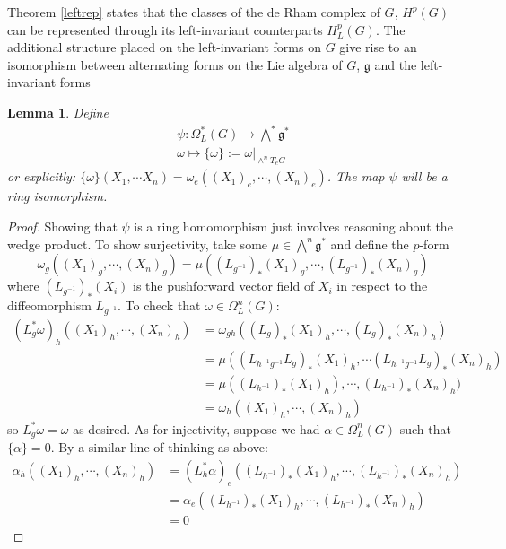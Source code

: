 \documentclass[12pt]{amsart}
\newtheorem{lemma}[theorem]{Lemma}
\numberwithin{equation}{section}
\begin{document}
%
Theorem \ref{leftrep} states that the classes of the de Rham complex of $G$, $H^p(G)$ can be represented through its left-invariant counterparts $H^p_L(G)$. The additional structure placed on the left-invariant forms on $G$ give rise to an isomorphism between alternating forms on the Lie algebra of $G$, $\mathfrak{g}$  and the left-invariant forms
\begin{lemma}
Define
      \begin{gather}
        \psi: \Omega_L^{*}(G) \rightarrow \bigwedge^* \mathfrak{g}^* \\
        \omega \mapsto \{\omega\} := \omega\vert_{\wedge^n T_eG}
      \end{gather}
or explicitly:
$\{\omega\}(X_1,\cdots X_n) = \omega_e((X_1)_e, \cdots, (X_n)_e)$. The map $\psi$ will be a ring isomorphism.
\end{lemma}
\begin{proof}
  Showing that $\psi$ is a ring homomorphism just involves reasoning about the wedge product. To show surjectivity, take some $\mu \in \bigwedge^n\mathfrak{g}^*$ and define the $p$-form
  $$ \omega_g((X_1)_g,\cdots,(X_n)_g) = \mu((L_{g^{-1}})_*(X_1)_g, \cdots, (L_{g^{-1}})_*(X_n)_g) $$
  where $(L_{g^{-1}})_*(X_i)$ is the pushforward vector field of $X_i$ in respect to the diffeomorphism $L_{g^{-1}}$. To check that $\omega \in \Omega_L^n(G)$:
  \begin{align*}
    (L^*_g\omega)_h((X_1)_h, \cdots ,(X_n)_h)
    & = \omega_{gh}((L_g)_*(X_1)_h,\cdots, (L_g)_*(X_n)_h) \\
    & = \mu((L_{h^{-1}g^{-1}}L_g)_*(X_1)_h, \cdots (L_{h^{-1}g^{-1}}L_g)_*(X_n)_h) \\
    & = \mu((L_{h^{-1}})_*(X_1)_h), \cdots, (L_{h^{-1}})_*(X_n)_h) \\
    & = \omega_h((X_1)_h, \cdots, (X_n)_h)
  \end{align*}
  so $L^*_g\omega = \omega$ as desired. As for injectivity, suppose we had $\alpha \in \Omega^n_L(G)$ such that $\{\alpha\} = 0$. By a similar line of thinking as above:
  \begin{align*}
    \alpha_h((X_1)_h,\cdots,(X_n)_h)
    & = (L^*_h\alpha)_e((L_{h^{-1}})_*(X_1)_h, \cdots, (L_{h^{-1}})_*(X_n)_h) \\
    &= \alpha_e((L_{h^{-1}})_*(X_1)_h, \cdots, (L_{h^{-1}})_*(X_n)_h) \\
    & = 0
  \end{align*}
\end{proof}
\end{document}

